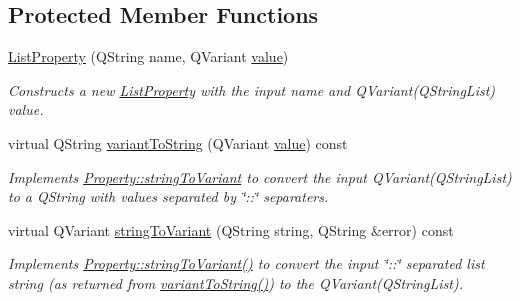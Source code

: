 \subsection*{Protected Member Functions}
\begin{DoxyCompactItemize}
\item 
\hypertarget{class_picto_1_1_list_property_a8dc64442839e8ba35293e97f8678576a}{\hyperlink{class_picto_1_1_list_property_a8dc64442839e8ba35293e97f8678576a}{List\-Property} (Q\-String name, Q\-Variant \hyperlink{class_picto_1_1_property_a69540c9d4f9a4b0b128b4c6a876d67ca}{value})}\label{class_picto_1_1_list_property_a8dc64442839e8ba35293e97f8678576a}

\begin{DoxyCompactList}\small\item\em Constructs a new \hyperlink{class_picto_1_1_list_property}{List\-Property} with the input name and Q\-Variant(\-Q\-String\-List) value. \end{DoxyCompactList}\item 
virtual Q\-String \hyperlink{class_picto_1_1_list_property_ab5b6d855b055256e2a9038f2ed04f1fb}{variant\-To\-String} (Q\-Variant \hyperlink{class_picto_1_1_property_a69540c9d4f9a4b0b128b4c6a876d67ca}{value}) const 
\begin{DoxyCompactList}\small\item\em Implements \hyperlink{class_picto_1_1_property_a97d52011d6db190c5c28a21d76ac1d3b}{Property\-::string\-To\-Variant} to convert the input Q\-Variant(\-Q\-String\-List) to a Q\-String with values separated by \char`\"{}\-::\char`\"{} separaters. \end{DoxyCompactList}\item 
\hypertarget{class_picto_1_1_list_property_a3cc9a3dca832e33e170a24c9284f260b}{virtual Q\-Variant \hyperlink{class_picto_1_1_list_property_a3cc9a3dca832e33e170a24c9284f260b}{string\-To\-Variant} (Q\-String string, Q\-String \&error) const }\label{class_picto_1_1_list_property_a3cc9a3dca832e33e170a24c9284f260b}

\begin{DoxyCompactList}\small\item\em Implements \hyperlink{class_picto_1_1_property_a97d52011d6db190c5c28a21d76ac1d3b}{Property\-::string\-To\-Variant()} to convert the input \char`\"{}\-::\char`\"{} separated list string (as returned from \hyperlink{class_picto_1_1_list_property_ab5b6d855b055256e2a9038f2ed04f1fb}{variant\-To\-String()}) to the Q\-Variant(\-Q\-String\-List). \end{DoxyCompactList}\end{DoxyCompactItemize}
